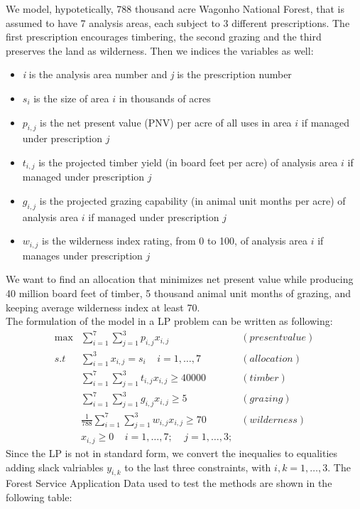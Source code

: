 \documentclass[a4paper,10 pt,titlepage,twoside]{book}
\theoremstyle{plain}
\theoremstyle{definition}
\theoremstyle{remark}
\begin{document}
We model, hypotetically, 788 thousand acre Wagonho National Forest, that is assumed to have 7 analysis areas, each subject to 3 different prescriptions. The first prescription encourages timbering, the second grazing and the third preserves the land as wilderness. Then we indices the variables as well:
\begin{itemize}
	\item \textit{i} is the analysis area number and \textit{j} is the prescription number
	\item $s_{i}$ is the size of area $i$ in thousands of acres
	\item $p_{i,j}$ is the net present value (PNV) per acre of all uses in area $i$ if managed under prescription $j$
	\item $t_{i,j}$ is the projected timber yield (in board feet per acre) of analysis area $i$ if managed under prescription $j$
	\item $g_{i,j}$ is the projected grazing capability (in animal unit months per acre) of analysis area $i$ if managed under prescription $j$
	\item $w_{i,j}$ is the wilderness index rating, from 0 to 100, of analysis area $i$ if manages under prescription $j$
\end{itemize}
We want to find an allocation that minimizes net present value while producing 40 million board feet of timber, 5 thousand animal unit months of grazing, and keeping average wilderness index at least 70.\\
The formulation of the model in a LP problem can be written as following:
\begin{align*}
\max&\sum_{i=1}^{7}\sum_{j=1}^{3} p_{i,j}x_{i,j}&(present value)\\
s.t& \sum_{i=1}^{3}x_{i,j}=s_{i}\;\;\;\;i = 1, \dots,7&(allocation)\\
&\sum_{i=1}^{7}\sum_{j=1}^{3} t_{i,j}x_{i,j}\geq 40000&(timber)\\
&\sum_{i=1}^{7}\sum_{j=1}^{3} g_{i,j}x_{i,j}\geq5&(grazing)\\
&\frac{1}{788}\sum_{i=1}^{7}\sum_{j=1}^{3} w_{i,j}x_{i,j}\geq 70&(wilderness)\\
&x_{i,j}\geq 0 \;\;\;\;i = 1,\dots,7;\;\;\;\;j = 1,\dots,3;
\end{align*}
Since the LP is not in standard form, we convert the inequalies to equalities adding slack valriables $y_{i,k}$ to the last three constraints, with $i, k = 1, \dots, 3$. The Forest Service Application Data used to test the methods are shown in the following table:\\
\end{document}
